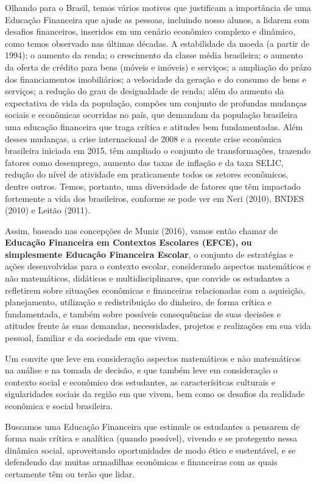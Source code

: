 \begin{paginatexto}
Olhando para o Brasil, temos vários motivos que justificam a importância de uma Educação Financeira que ajude as pessoas, incluindo nosso alunos, a lidarem com desafios financeiros, inseridos em um cenário econômico complexo e dinâmico, como temos observado nas últimas décadas. A estabilidade da moeda (a partir de 1994); o aumento da renda; o crescimento da classe média brasileira; o aumento da oferta de crédito para bens (móveis e imóveis) e serviços; a ampliação do prázo dos financiamentos imobiliários; a velocidade da geração e do consumo  de bens e serviços; a redução do grau de desigualdade de renda; além do aumento da expectativa de vida da população, compões um conjunto de profundas mudanças sociais e econômicas ocorridas no país, que demandam da população brasileira uma educação financeira que traga crítica e atitudes bem fundamentadas. Além desses mudanças, a crise internacional de 2008 e a recente crise econômica brasileira iniciada em 2015, têm ampliado o conjunto de transformações, trazendo fatores como desemprego, aumento das taxas de inflação e da taxa SELIC, redução do nível de atividade em praticamente todos os setores econômicos, dentre outros. Temos, portanto, uma diversidade de fatores que têm impactado fortemente a vida dos brasileiros, conforme se pode ver em Neri (2010), BNDES (2010) e Leitão (2011).

Assim, baseado nas concepções de Muniz (2016), vamos então chamar de \textbf{Educação Financeira em Contextos Escolares (EFCE), ou simplesmente Educação Financeira Escolar}, o conjunto de estratégias e ações desenvolvidas para o contexto escolar, considerando aspectos matemáticos e não matemáticos, didáticos e multidisciplinares, que convide os estudantes a refletirem sobre situações econômicas e financeiras relacionadas com a aquisição, planejamento, utilização e redistribuição do dinheiro, de forma crítica e fundamentada, e também sobre possíveis consequências de suas decisões e atitudes frente às suas demandas, necessidades, projetos e realizações em sua vida pessoal, familiar e da sociedade em que vivem.

Um convite que leve em consideração aspectos matemáticos e nào matemáticos na análise e na tomada de decisão, e que também leve em consideração o contexto social e econômico dos estudantes, as caracterísitcas culturais e sigularidades sociais da região em que vivem, bem como os desafios da realidade econômica e social brasileira.

Buscamos uma Educação Financeira que estimule os estudantes a pensarem de forma mais crítica e analítica (quando possível), vivendo e se protegento nessa dinâmica social, aproveitando oportunidades de modo ético e sustentável, e se defendendo das muitas armadilhas econômicas e financeiras com as quais certamente têm ou terão que lidar.


\end{paginatexto}
